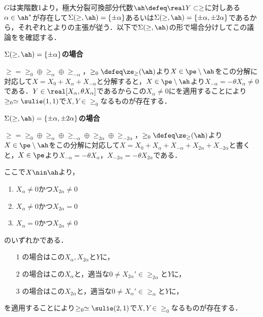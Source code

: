 \begin{npfwn}
  $G$は実階数1より，極大分裂可換部分代数$\ah\defeq \real Y\subset \ge$に対しある$\alpha\in \ah^{*} $が存在して$\Sigma(\ge,\ah) = \{\pm\alpha\} $あるいは$\Sigma(\ge,\ah)  = \{\pm\alpha, \pm 2\alpha \} $であるから，それぞれとよりの主張が従う．以下で$\Sigma(\ge,\ah)$の形で場合分けしてこの議論をを確認する．
  \begin{case}
    \textbf{$\Sigma(\ge,\ah) = \{\pm\alpha\} $の場合}

    $\ge = \ge_{0} \oplus \ge_{\alpha}\oplus \ge_{-\alpha} $，$\ge_0 \defeq \ze_{\ge}(\ah) $より$X\in  \pe\setminus \ah$をこの分解に対応して$X = X_0 + X_{\alpha} + X_{-\alpha} $と分解すると，$X\in \pe\setminus \ah$より$ X_{-\alpha} = -\theta X_{\alpha}\neq 0 $である．$Y\in \real [X_{\alpha}, \theta X_{\alpha}] $であるからこの$X_{\alpha}\neq 0 $にを適用することにより$\ge_0\simeq \sulie(1,1)$で$X,Y\in \ge_0 $なるものが存在する．
    
  \end{case}
  
  \begin{case}
    \textbf{$\Sigma(\ge,\ah) = \{\pm\alpha, \pm 2\alpha\} $の場合}

    $\ge = \ge_{0} \oplus \ge_{\alpha}\oplus \ge_{-\alpha} \oplus \ge_{2\alpha}\oplus \ge_{-2\alpha}  $，$\ge_0 \defeq \ze_{\ge}(\ah) $より$X\in \pe\setminus \ah$をこの分解に対応して$X = X_0 + X_{\alpha} + X_{-\alpha} + X_{2\alpha} + X_{-2\alpha} $と書くと，$X\in \pe$より$ X_{-\alpha} = - \theta X_{\alpha} $，$ X_{-2\alpha} = - \theta X_{2\alpha} $である．

    ここで$X\nin \ah$より，
    \begin{enumerate}
    \item $X_{\alpha}\neq 0 $かつ$X_{2\alpha}\neq 0 $
    \item $X_{\alpha}\neq 0 $かつ$X_{2\alpha} =  0 $
    \item $X_{\alpha} =  0 $かつ$X_{2\alpha} \neq  0 $
    \end{enumerate}
    のいずれかである．
    \begin{enumerate}
    \item[1] の場合はこの$X_{\alpha}, X_{2\alpha} $と$Y$に，
    \item[2] の場合はこの$X_{\alpha}$と，適当な$0\neq X_{2\alpha}'\in \ge_{2\alpha} $と$Y$に，
    \item[3] の場合はこの$X_{2\alpha}$と，適当な$0\neq X_{\alpha}'\in \ge_{\alpha} $と$Y$に，
    \end{enumerate}
    を適用することにより$\ge_0\simeq \sulie(2,1)$で$X,Y\in \ge_0 $なるものが存在する．    
  \end{case}   
\end{npfwn}

